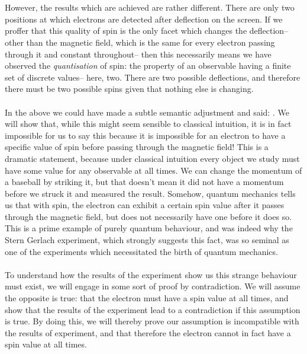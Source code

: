 \\\\
However, the results which are achieved are rather different. There are only two positions at which electrons are detected after deflection on the screen. If we proffer that this quality of spin is the only facet which changes the deflection-- other than the magnetic field, which is the same for every electron passing through it and constant throughout-- then this necessarily means we have observed the \textit{quantisation} of spin: the property of an observable having a finite set of discrete values-- here, two. There are two possible deflections, and therefore there must be two possible spins given that nothing else is changing.
\\\\
In the above we could have made a subtle semantic adjustment and said: . We will show that, while this might seem sensible to classical intuition, it is in fact impossible for us to say this because it is impossible for an electron to have a specific value of spin before passing through the magnetic field! This is a dramatic statement, because under classical intuition every object we study must have some value for any observable at all times. We can change the momentum of a baseball by striking it, but that doesn't mean it did not have a momentum before we struck it and measured the result. Somehow, quantum mechanics tells us that with spin, the electron can exhibit a certain spin value after it passes through the magnetic field, but does not necessarily have one before it does so. This is a prime example of purely quantum behaviour, and was indeed why the Stern Gerlach experiment, which strongly suggests this fact, was so seminal as one of the experiments which necessitated the birth of quantum mechanics.
\\\\
To understand how the results of the experiment show us this strange behaviour must exist, we will engage in some sort of proof by contradiction. We will assume the opposite is true: that the electron must have a spin value at all times, and show that the results of the experiment lead to a contradiction if this assumption is true. By doing this, we will thereby prove our assumption is incompatible with the results of experiment, and that therefore the electron cannot in fact have a spin value at all times.
\\\\
